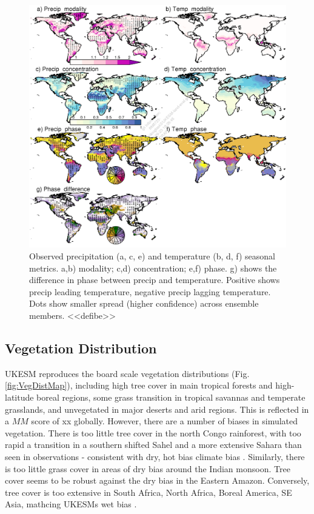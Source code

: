 \begin{figure}[t]
    \includegraphics[width=12cm]{figs/Climate/climStuff-Observations.png}
    \caption{Observed precipitation (a, c, e) and temperature (b, d, f) seasonal metrics. a,b) modality; c,d) concentration; e,f) phase. g) shows the difference in phase between precip and temperature. Positive shows precip leading temperature, negative precip lagging temperature. Dots show smaller spread (higher confidence) across ensemble members. <<defibe>> \label{fig:ClimateSeasonObsMaps}}
\end{figure}

\subsection{Vegetation Distribution}
UKESM reproduces the board scale vegetation distributions (Fig. \ref{fig:VegDistMap}), including high tree cover in main tropical forests and high-latitude boreal regions, some grass transition in tropical savannas and temperate grasslands, and unvegetated in major deserts and arid regions. This is reflected in a $MM$ score of xx globally. However, there are a number of biases in simulated vegetation. There is too little tree cover in the north Congo rainforest, with too rapid a transition in a southern shifted Sahel and a more extensive Sahara than seen in observations - consistent with dry, hot bias climate bias \label{fig:ClimateAAMaps}. Similarly, there is too little grass cover in areas of dry bias around the Indian monsoon. Tree cover seems to be robust against the dry bias in the Eastern Amazon. Conversely, tree cover is too extensive in South Africa, North Africa, Boreal America, SE Asia, mathcing UKESMs wet bias  \label{fig:ClimateAAMaps}. 

